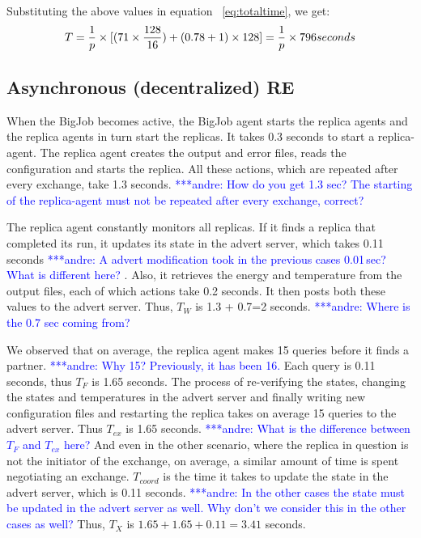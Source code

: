 \documentclass{rspublic}
\newcommand{\alnote}[1]{ {\textcolor{blue} { ***andre: #1 }}}
\newcommand{\alnote}[1]{}
\begin{document}


Substituting the above values in equation ~\ref{eq:totaltime}, we get:
\begin{eqnarray}
T=  {1 \over p} \times {[ {(71\times {128\over 16}}) + (0.78 + 1)\times 128]} = {1 \over p} \times 796 seconds
\label{eq:cent}
\end{eqnarray}


\subsection{Asynchronous (decentralized) RE}

When the BigJob becomes active, the BigJob agent starts the replica
agents and the replica agents in turn start the replicas. It takes 0.3
seconds to start a replica-agent.  The replica agent creates the
output and error files, reads the configuration and starts the
replica. All these actions, which are repeated after every exchange,
take 1.3 seconds. \alnote{How do you get 1.3 sec? The starting of the replica-agent
must not be repeated after every exchange, correct?}

The replica agent constantly monitors all replicas. If it finds
a replica that completed its run, it updates its state in the advert
server, which takes 0.11 seconds \alnote{A advert modification took in the previous
cases 0.01\,sec? What is different here?}. Also, it retrieves the energy and
temperature from the output files, each of which actions take 0.2
seconds. It then posts both these values to the advert server. Thus,
$T_W$ is 1.3 + 0.7=2 seconds.\alnote{Where is the 0.7 sec coming from?}

We observed that on average, the replica agent makes 15 queries before
it finds a partner.\alnote{Why 15? Previously, it has been 16.} 
Each query is 0.11 seconds, thus $T_F$ is 1.65
seconds. The process of re-verifying the states, changing the states
and temperatures in the advert server and finally writing new
configuration files and restarting the replica takes on average 15
queries to the advert server. Thus $T_{ex}$ is 1.65 seconds. 
\alnote{What is the difference between $T_F$ and $T_{ex}$ here?} 
And even in the other scenario, where the replica in question is not the
initiator of the exchange, on average, a similar amount of time is
spent negotiating an exchange.  $T_{coord}$ is the time it takes to
update the state in the advert server, which is 0.11 seconds. \alnote{In the other
cases the state must be updated in the advert server as well. Why don't we consider
this in the other cases as well?} Thus,
$T_{X}$ is $1.65+1.65+0.11= 3.41$ seconds.
\end{document}

